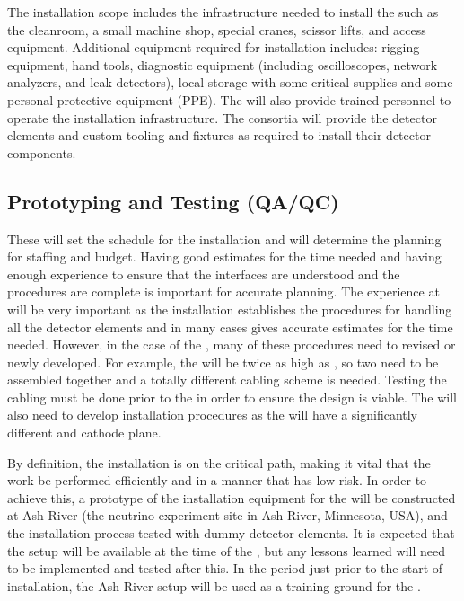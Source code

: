 The installation scope includes the infrastructure needed to install
the  such as the cleanroom, a small machine shop, special
cranes, scissor lifts, and access equipment.  Additional equipment
required for installation includes: rigging equipment, hand tools,
diagnostic equipment (including oscilloscopes, network analyzers, and
leak detectors), local storage with some critical supplies and some
personal protective equipment (PPE). The  will also provide
trained personnel to operate the installation infrastructure. The
consortia will provide the detector elements and custom tooling and
fixtures as required to install their detector components.





\subsection{Prototyping and Testing (QA/QC)}
\label{sec:fdsp-tc-inst-qaqc}



These will set the schedule for the installation and will
determine the planning for staffing and budget. Having good estimates
for the time needed and having enough experience to ensure that the
interfaces are understood and the procedures are complete is important
for accurate planning. The experience at  will be
very important as the  installation establishes the
procedures for handling all the detector elements and in many cases
gives accurate estimates for the time needed. However, in the case of
the , many of these procedures need to revised or
newly developed. For example, the  will be twice as high as
, so two  need to be assembled together
and a totally different cabling scheme is needed. Testing the
cabling must be done prior to the  %
in order to
ensure the design is viable. The  will also need to develop
installation procedures as the  
will have a significantly different  and cathode plane. 

By definition, the installation  is on the critical path, making it vital
that the work be performed efficiently and in a manner that has low
risk. In order to achieve this, a prototype of the installation
equipment for the   will be constructed at Ash
River (the \nova neutrino experiment  site in Ash River, Minnesota, USA), and the installation process tested with dummy detector
elements. It is expected that the setup will be available at the time
of the , but any lessons learned will need to be implemented and
tested after this. In the period just prior to the start of
installation, the Ash River setup will be used as a training ground for
the .




